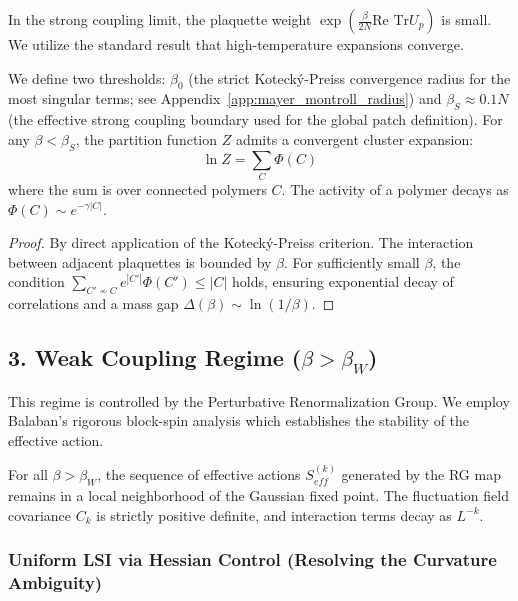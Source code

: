 In the strong coupling limit, the plaquette weight $\exp(\frac{\beta}{2N} \text{Re Tr} U_p)$ is small. We utilize the standard result that high-temperature expansions converge.

\begin{lemma}
We define two thresholds: $\beta_0$ (the strict Kotecký-Preiss convergence radius for the most singular terms; see Appendix~\ref{app:mayer_montroll_radius}) and $\beta_S \approx 0.1 N$ (the effective strong coupling boundary used for the global patch definition).
For any $\beta < \beta_S$, the partition function $Z$ admits a convergent cluster expansion:
\[ \ln Z = \sum_{C} \Phi(C) \]
where the sum is over connected polymers $C$. The activity of a polymer decays as $\Phi(C) \sim e^{-\gamma |C|}$.
\end{lemma}

\begin{proof}
By direct application of the Kotecký-Preiss criterion. The interaction between adjacent plaquettes is bounded by $\beta$. For sufficiently small $\beta$, the condition $\sum_{C' \nsim C} e^{|C'|} \Phi(C') \le |C|$ holds, ensuring exponential decay of correlations and a mass gap $\Delta(\beta) \sim \ln(1/\beta)$.
\end{proof}

\subsection{3. Weak Coupling Regime (\texorpdfstring{$\beta > \beta_W$}{β > βW})}
\label{sec:weak_proof}

This regime is controlled by the Perturbative Renormalization Group. We employ Balaban's rigorous block-spin analysis which establishes the stability of the effective action.

\begin{theorem}
For all $\beta > \beta_W$, the sequence of effective actions $S_{eff}^{(k)}$ generated by the RG map remains in a local neighborhood of the Gaussian fixed point. The fluctuation field covariance $C_k$ is strictly positive definite, and interaction terms decay as $L^{-k}$.
\end{theorem}

\subsubsection{Uniform LSI via Hessian Control (Resolving the Curvature Ambiguity)}

